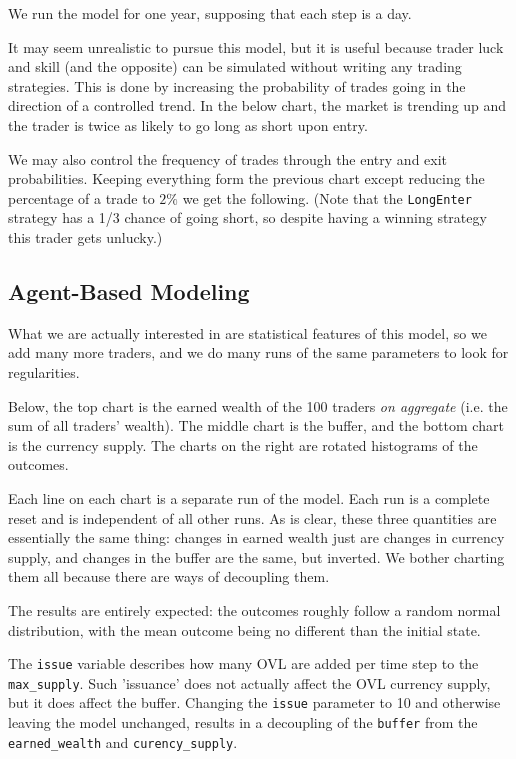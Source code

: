 \documentclass[11pt]{article}
\begin{document}
We run the model for one year, supposing that each step is a day.

    

    It may seem unrealistic to pursue this model, but it is useful because
trader luck and skill (and the opposite) can be simulated without
writing any trading strategies. This is done by increasing the
probability of trades going in the direction of a controlled trend. In
the below chart, the market is trending up and the trader is twice as
likely to go long as short upon entry.

    

    We may also control the frequency of trades through the entry and exit
probabilities. Keeping everything form the previous chart except
reducing the percentage of a trade to \(2\%\) we get the following.
(Note that the \texttt{LongEnter} strategy has a 1/3 chance of going
short, so despite having a winning strategy this trader gets unlucky.)

    

    \subsection{Agent-Based Modeling}\label{agent-based-modeling}

    What we are actually interested in are statistical features of this
model, so we add many more traders, and we do many runs of the same
parameters to look for regularities.

Below, the top chart is the earned wealth of the 100 traders \emph{on
aggregate} (i.e. the sum of all traders' wealth). The middle chart is
the buffer, and the bottom chart is the currency supply. The charts on
the right are rotated histograms of the outcomes.

Each line on each chart is a separate run of the model. Each run is a
complete reset and is independent of all other runs. As is clear, these
three quantities are essentially the same thing: changes in earned
wealth just are changes in currency supply, and changes in the buffer
are the same, but inverted. We bother charting them all because there
are ways of decoupling them.

The results are entirely expected: the outcomes roughly follow a random
normal distribution, with the mean outcome being no different than the
initial state.

    

    The \texttt{issue} variable describes how many OVL are added per time
step to the \texttt{max\_supply}. Such 'issuance' does not actually
affect the OVL currency supply, but it does affect the buffer. Changing
the \texttt{issue} parameter to 10 and otherwise leaving the model
unchanged, results in a decoupling of the \texttt{buffer} from the
\texttt{earned\_wealth} and \texttt{curency\_supply}.
\end{document}
